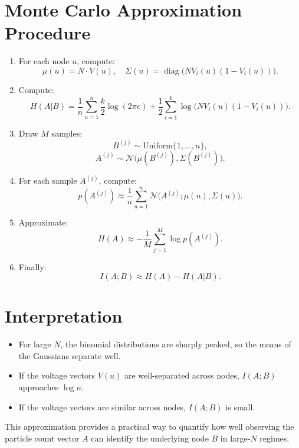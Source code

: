 \documentclass[11pt]{article}
\begin{document}
\section*{Monte Carlo Approximation Procedure}

\begin{enumerate}
    \item For each node $u$, compute:
    \[
    \mu(u) = N \cdot V(u), \quad \Sigma(u) = \operatorname{diag}\big(N V_i(u)(1 - V_i(u))\big).
    \]
    
    \item Compute:
    \[
    H(A|B) = \frac{1}{n} \sum_{u=1}^n \frac{k}{2}\log(2\pi e) + \frac{1}{2} \sum_{i=1}^k \log\big(N V_i(u)(1 - V_i(u))\big).
    \]
    
    \item Draw $M$ samples:
    \[
    B^{(j)} \sim \text{Uniform}\{1, \ldots, n\},
    \]
    \[
    A^{(j)} \sim \mathcal{N}\big(\mu(B^{(j)}), \Sigma(B^{(j)})\big).
    \]
    
    \item For each sample $A^{(j)}$, compute:
    \[
    p(A^{(j)}) \approx \frac{1}{n} \sum_{u=1}^n \mathcal{N}\big(A^{(j)}; \mu(u), \Sigma(u)\big).
    \]
    
    \item Approximate:
    \[
    H(A) \approx -\frac{1}{M} \sum_{j=1}^M \log p(A^{(j)}).
    \]
    
    \item Finally:
    \[
    I(A; B) \approx H(A) - H(A|B).
    \]
\end{enumerate}

\section*{Interpretation}

\begin{itemize}
    \item For large $N$, the binomial distributions are sharply peaked, so the means of the Gaussians separate well.
    \item If the voltage vectors $V(u)$ are well-separated across nodes, $I(A; B)$ approaches $\log n$.
    \item If the voltage vectors are similar across nodes, $I(A; B)$ is small.
\end{itemize}

This approximation provides a practical way to quantify how well observing the particle count vector $A$ can identify the underlying node $B$ in large-$N$ regimes.
\end{document}
